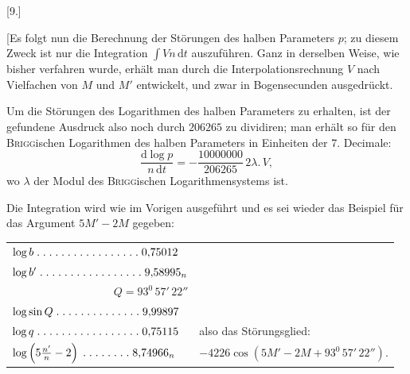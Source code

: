 \clearpage
\begin{landscape}
\begingroup
\fontsize{10}{13}\selectfont
{}
\renewcommand{\headrulewidth}{0pt}
\begin{center}[9.]\end{center}
\par\noindent\hspace*{\parindent}[Es folgt nun die Berechnung der Störungen des halben Parameters \(p\); zu diesem Zweck ist nur die Integration \(\int Vn\,\mathrm{d}t\) auszuführen. Ganz in derselben Weise, wie bisher verfahren wurde, erhält man durch die Interpolationsrechnung \(V\) nach Vielfachen von \(M\) und \(M'\) entwickelt, und zwar in Bogensecunden ausgedrückt.
\par\noindent\hspace*{\parindent}Um die Störungen des Logarithmen des halben Parameters zu erhalten, ist der gefundene Ausdruck also noch durch \(206265\) zu dividiren; man erhält so für den \textsc{Brigg}ischen Logarithmen des halben Parameters in Einheiten der 7. Decimale:
\[
\frac{\mathrm{d}\log p}{n\,\mathrm{d}t}=-\frac{10000000}{206265}\,2\lambda\mathord{.}\,V,
\]
\noindent wo \(\lambda\) der Modul des \textsc{Brigg}ischen Logarithmensystems ist.
\par\noindent\hspace*{\parindent}Die Integration wird wie im Vorigen ausgeführt und es sei wieder das Beispiel für das Argument \(5M'-2M\) gegeben:
\begingroup
\newcommand{\VNinePoint}{\mathord{.}\mkern5mu}
\newcommand{\VNineFive}{\VNinePoint\VNinePoint\VNinePoint\VNinePoint\VNinePoint}
\begin{center}
\begin{tabular}{@{}l@{\quad}l@{}}
\(\log b\;\VNineFive\VNineFive\VNineFive\VNinePoint\VNinePoint0{,}75012\)&\\
\(\log b'\;\VNineFive\VNineFive\VNineFive\VNinePoint\VNinePoint9{,}58995_n\)&\\
\multicolumn{1}{r}{\(Q=93^0\,57'\,22''\)}&\\
\(\log\sin Q\;\VNineFive\VNineFive\VNinePoint\VNinePoint\VNinePoint\VNinePoint9{,}99897\)&\\
\(\log q\;\VNineFive\VNineFive\VNineFive\VNinePoint\VNinePoint0{,}75115\)&also das Störungsglied:\\
\(\log\left(5\frac{n'}{n}-2\right)\;\VNineFive\VNinePoint\VNinePoint\VNinePoint8{,}74966_n\)&\(-4226\cos(5M'-2M+93^0\,57'\,22'').\)\\

\end{tabular}
\end{center}
\end{landscape}
